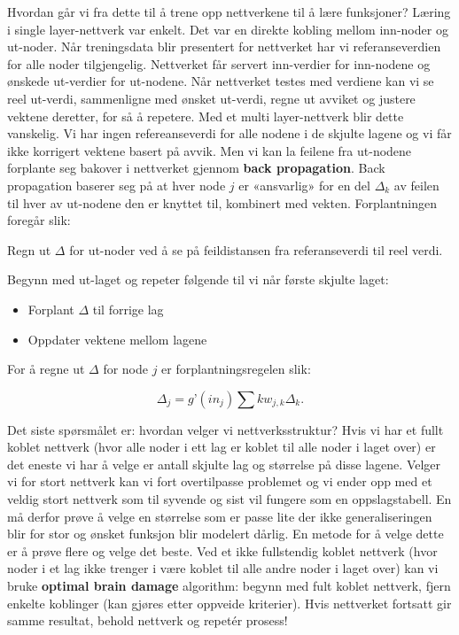 Hvordan går vi fra dette til å trene opp nettverkene til å lære funksjoner? Læring i single layer-nettverk var enkelt. Det var en direkte kobling mellom inn-noder og ut-noder. Når treningsdata blir presentert for nettverket har vi referanseverdien for alle noder tilgjengelig. Nettverket får servert inn-verdier for inn-nodene og ønskede ut-verdier for ut-nodene. Når nettverket testes med verdiene kan vi se reel ut-verdi, sammenligne med ønsket ut-verdi, regne ut avviket og justere vektene deretter, for så å repetere. Med et multi layer-nettverk blir dette vanskelig. Vi har ingen refereanseverdi for alle nodene i de skjulte lagene og vi får ikke korrigert vektene basert på avvik. Men vi kan la feilene fra ut-nodene forplante seg bakover i nettverket gjennom \textbf{back propagation}. Back propagation baserer seg på at hver node $j$ er «ansvarlig» for en del $\Delta_k$ av feilen til hver av ut-nodene den er knyttet til, kombinert med vekten. Forplantningen foregår slik:

\begin{items}
\item Regn ut $\Delta$ for ut-noder ved å se på feildistansen fra referanseverdi til reel verdi.
\item Begynn med ut-laget og repeter følgende til vi når første skjulte laget:
\begin{itemize}
\item Forplant $\Delta$ til forrige lag
\item Oppdater vektene mellom lagene
\end{itemize}
\end{items}

For å regne ut $\Delta$ for node $j$ er forplantningsregelen slik:

\begin{equation}
\Delta_j = g’(in_j)\sum\limits{k}w_{j,k}\Delta_{k}.
\end{equation}

Det siste spørsmålet er: hvordan velger vi nettverksstruktur? Hvis vi har et fullt koblet nettverk (hvor alle noder i ett lag er koblet til alle noder i laget over) er det eneste vi har å velge er antall skjulte lag og størrelse på disse lagene. Velger vi for stort nettverk kan vi fort overtilpasse problemet og vi ender opp med et veldig stort nettverk som til syvende og sist vil fungere som en oppslagstabell. En må derfor prøve å velge en størrelse som er passe lite der ikke generaliseringen blir for stor og ønsket funksjon blir modelert dårlig. En metode for å velge dette er å prøve flere og velge det beste. Ved et ikke fullstendig koblet nettverk (hvor noder i et lag ikke trenger i være koblet til alle andre noder i laget over) kan vi bruke \textbf{optimal brain damage} algorithm: begynn med fult koblet nettverk, fjern enkelte koblinger (kan gjøres etter oppveide kriterier). Hvis nettverket fortsatt gir samme resultat, behold nettverk og repetér prosess!

